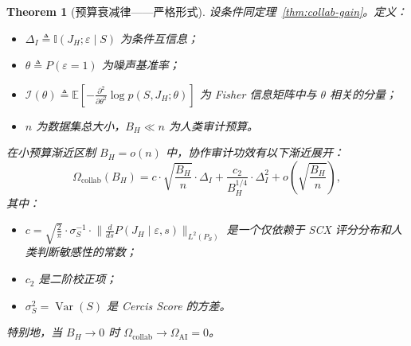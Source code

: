 \documentclass[12pt,a4paper]{article}
\newtheorem{theorem}{Theorem}[section]
\newcommand{\E}{\mathbb{E}}
\newcommand{\I}{\mathbb{I}}
\newcommand{\Var}{\operatorname{Var}}
\newcommand{\Fisher}{\mathcal{I}}
\begin{document}
\begin{theorem}[预算衰减律——严格形式]
\label{thm:budget-decay}
设条件同定理~\ref{thm:collab-gain}。定义：
\begin{itemize}
    \item $\Delta_I \triangleq \I(J_H; \varepsilon \mid S)$ 为条件互信息；
    \item $\theta \triangleq P(\varepsilon=1)$ 为噪声基准率；
    \item $\Fisher(\theta) \triangleq \E\left[ -\frac{\partial^2}{\partial\theta^2}
          \log p(S, J_H; \theta) \right]$ 为 Fisher 信息矩阵中与 $\theta$ 相关的分量；
    \item $n$ 为数据集总大小，$B_H \ll n$ 为人类审计预算。
\end{itemize}
在小预算渐近区制 $B_H = o(n)$ 中，协作审计功效有以下渐近展开：
\begin{equation}\label{eq:budget-decay-formal}
    \Omega_{\mathrm{collab}}(B_H) =
    c \cdot \sqrt{\frac{B_H}{n}} \cdot \Delta_I
    + \frac{c_2}{B_H^{1/4}} \cdot \Delta_I^2
    + o\!\left(\sqrt{\frac{B_H}{n}}\right),
\end{equation}
其中：
\begin{itemize}
    \item $c = \sqrt{\frac{2}{\pi}} \cdot \sigma_S^{-1} \cdot
          \big\| \frac{d}{ds} P(J_H \mid \varepsilon, s) \big\|_{L^2(P_S)}$ 是一个仅依赖于
          SCX 评分分布和人类判断敏感性的常数；
    \item $c_2$ 是二阶校正项；
    \item $\sigma_S^2 = \Var(S)$ 是 Cercis Score 的方差。
\end{itemize}
特别地，当 $B_H \to 0$ 时 $\Omega_{\mathrm{collab}} \to \Omega_{\mathrm{AI}} = 0$。
\label{thm:budget-decay-end}
\end{theorem}
\end{document}
